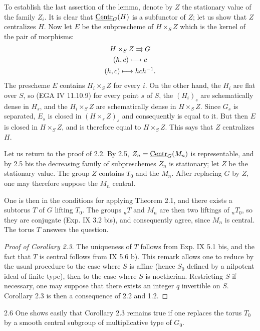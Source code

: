 To establish the last assertion of the lemma, denote by $Z$ the stationary value of the family $Z_i$. It is clear that $\underline{\mathrm{Centr}}_G(H)$ is a subfunctor of $Z$; let us show that $Z$ centralizes $H$. Now let $E$ be the subprescheme of $H\times_S Z$ which is the kernel of the pair of morphisms:
\[
\begin{gathered}
H\times_S Z\rightrightarrows G\\
(h,c)\longmapsto c\\
(h,c)\longmapsto hch^{-1}.
\end{gathered}
\]
The prescheme $E$ contains $H_i\times_S Z$ for every $i$. On the other hand, the $H_i$ are flat over $S$, so (EGA IV 11.10.9) for every point $s$ of $S$, the $(H_i)_s$ are schematically dense in $H_s$, and the $H_i\times_S Z$ are schematically dense in $H\times_S Z$. Since $G_s$ is separated, $E_s$ is closed in $(H\times_s Z)_s$ and consequently is equal to it. But then $E$ is closed in $H\times_S Z$, and is therefore equal to $H\times_S Z$. This says that $Z$ centralizes $H$.

Let us return to the proof of 2.2. By 2.5, $Z_n=\underline{\mathrm{Centr}}_G(M_n)$ is representable, and by 2.5 bis the decreasing family of subpreschemes $Z_n$ is stationary; let $Z$ be the stationary value. The group $Z$ contains $T_0$ and the $M_n$. After replacing $G$ by $Z$, one may therefore suppose the $M_n$ central.

One is then in the conditions for applying Theorem 2.1, and there exists a subtorus $T$ of $G$ lifting $T_0$. The groups ${}_nT$ and $M_n$ are then two liftings of ${}_nT_0$, so they are conjugate (Exp. IX 3.2 bis), and consequently agree, since $M_n$ is central. The torus $T$ answers the question.

\begin{proof}[Proof of Corollary 2.3]
The uniqueness of $T$ follows from Exp. IX 5.1 bis, and the fact that $T$ is central follows from IX 5.6 b). This remark allows one to reduce by the usual procedure to the case where $S$ is affine (hence $S_0$ defined by a nilpotent ideal of finite type), then to the case where $S$ is noetherian. Restricting $S$ if necessary, one may suppose that there exists an integer $q$ invertible on $S$. Corollary 2.3 is then a consequence of 2.2 and 1.2.
\end{proof}

\begin{remark}{2.6}\label{XV.2.6}
One shows easily that Corollary 2.3 remains true if one replaces the torus $T_0$ by a smooth central subgroup of multiplicative type of $G_0$.
\end{remark}

